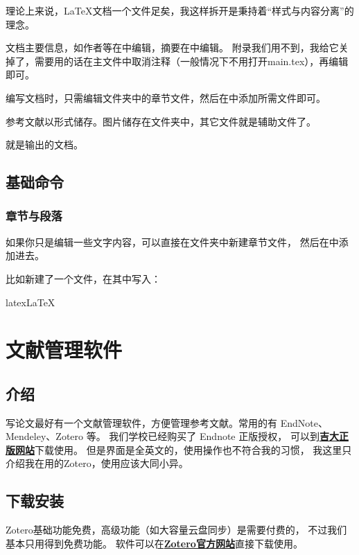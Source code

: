 理论上来说，\LaTeX{}文档一个文件足矣，我这样拆开是秉持着“样式与内容分离”的理念。

文档主要信息，如作者等在中编辑，摘要在中编辑。
附录我们用不到，我给它关掉了，需要用的话在主文件中取消注释（一般情况下不用打开main.tex），再编辑即可。

编写文档时，只需编辑文件夹中的章节文件，然后在中添加所需文件即可。

参考文献以形式储存。图片储存在文件夹中，其它文件就是辅助文件了。

就是输出的文档。

\subsection{基础命令}
\subsubsection{章节与段落}

如果你只是编辑一些文字内容，可以直接在文件夹中新建章节文件，
然后在中添加进去。

比如新建了一个文件，在其中写入：
\begin{envcode}{latex}{LaTeX}
\section{文献管理软件}
\subsection{介绍}
写论文最好有一个文献管理软件，方便管理参考文献。常用的有 EndNote、Mendeley、Zotero 等。
我们学校已经购买了 Endnote 正版授权，
可以到\textbf{\textcolor{blue}
{\href{https://zbhrj1.jlu.edu.cn/download/EndNote21W.html}{吉大正版网站}}}下载使用。
但是界面是全英文的，使用操作也不符合我的习惯，
我这里只介绍我在用的Zotero，使用应该大同小异。
    
\subsection{下载安装}
Zotero基础功能免费，高级功能（如大容量云盘同步）是需要付费的，
不过我们基本只用得到免费功能。
软件可以在\textbf{\textcolor{blue}
{\href{https://www.zotero.org/}{Zotero官方网站}}}直接下载使用。
\end{envcode}


